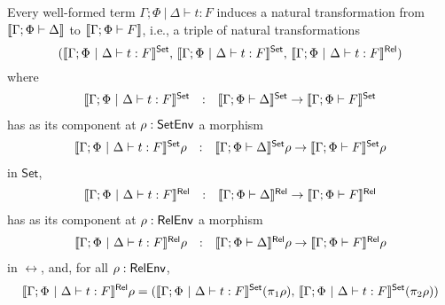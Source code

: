 \documentclass[runningheads]{llncs}
\newcommand{\set}{\mathsf{Set}}
\begin{document}
\begin{theorem}\label{thm:at-gen}
Every well-formed term $\Gamma;\Phi~|~\Delta \vdash t : F$ induces
a natural transformation from $\llbracket{\Gamma; \Phi \vdash \Delta}\rrbracket$ to
$\llbracket{\Gamma; \Phi \vdash F}\rrbracket$, i.e., a triple of natural
transformations 
\[(\setsem{\Gamma;\Phi~|~\Delta \vdash t : F},\,
\setsem{\Gamma;\Phi~|~\Delta \vdash t : F},\,
\relsem{\Gamma;\Phi~|~\Delta \vdash t : F})\]
where
\[\begin{array}{lll}
\setsem{\Gamma;\Phi~|~\Delta \vdash t : F} & : & \setsem{\Gamma;
  \Phi \vdash \Delta} \to \setsem{\Gamma; \Phi \vdash F}
\end{array}\]
has as its component at $\rho : \mathsf{SetEnv}$ a morphism
\[\begin{array}{lll}
\setsem{\Gamma;\Phi~|~\Delta \vdash t : F}\rho & : & \setsem{\Gamma;
  \Phi \vdash \Delta}\rho \to \setsem{\Gamma; \Phi \vdash F}\rho
\end{array}\]
in $\set$,
\[\begin{array}{lll}
\llbracket{\Gamma;\Phi~|~\Delta \vdash t : F}\rrbracket^{\mathsf{Rel}} & : & \llbracket{\Gamma;
  \Phi \vdash \Delta}\rrbracket^{\mathsf{Rel}} \to \llbracket{\Gamma; \Phi \vdash F}\rrbracket^{\mathsf{Rel}}
\end{array}\]
has as its component at $\rho : \mathsf{RelEnv}$ a morphism
\[\begin{array}{lll}
\llbracket{\Gamma;\Phi~|~\Delta \vdash t : F}\rrbracket^{\mathsf{Rel}}\rho & : & \llbracket{\Gamma;
  \Phi \vdash \Delta}\rrbracket^{\mathsf{Rel}}\rho \to \llbracket{\Gamma; \Phi \vdash F}\rrbracket^{\mathsf{Rel}}\rho
\end{array}\]
in $\rel$,
and, for all $\rho : \mathsf{RelEnv}$,
\begin{equation}\label{eq:projs}
\relsem{\Gamma;\Phi~|~\Delta \vdash t : F}\rho =
(\setsem{\Gamma;\Phi~|~\Delta \vdash t : F}(\pi_1 \rho),\,
\setsem{\Gamma;\Phi~|~\Delta \vdash t : F}(\pi_2 \rho))
\end{equation}
\end{theorem}
\end{document}
